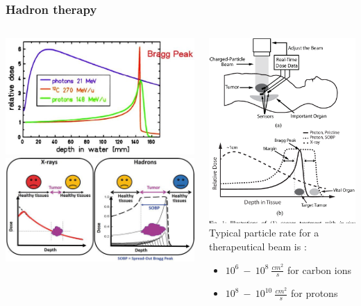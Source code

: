 \documentclass[aspectratio=169]{beamer}
\begin{document}
	\begin{frame}
	\frametitle{Hadron therapy}
	\begin{columns}
		\begin{center}
			\includegraphics[width=0.75 \textwidth]{IMG/Bragg_Peak.PNG}
			\includegraphics[width=0.65 \textwidth]{IMG/Bragg_Peak2.PNG}
		\end{center}
		\begin{center}
			\includegraphics[width=0.3 \textwidth]{IMG/HadroTherapy.PNG}
			\newline
			Typical particle rate for a therapeutical beam is :
			\begin{itemize}
				\item $10^6 \:- \: 10^8 \: \frac{cm^2}{s}$ for carbon ions
				\item $10^8 \:- \: 10^{10} \: \frac{cm^2}{s}$ for protons
			\end{itemize}
		\end{center}
	\end{columns}
	
	\end{frame}
\end{document}
